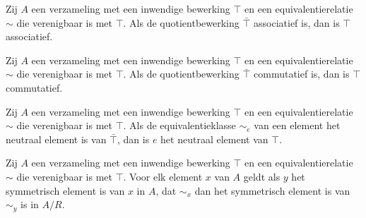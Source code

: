 \documentclass[main.tex]{subfiles}
\begin{document}
\begin{st}
    Zij $A$ een verzameling met een inwendige bewerking $\top$ en een equivalentierelatie $\sim$ die verenigbaar is met $\top$.
    Als de quotientbewerking $\bar{\top}$ associatief is, dan is $\top$ associatief.
  
\end{st}

\begin{st}
    Zij $A$ een verzameling met een inwendige bewerking $\top$ en een equivalentierelatie $\sim$ die verenigbaar is met $\top$.
    Als de quotientbewerking $\bar{\top}$ commutatief is, dan is $\top$ commutatief.
  
\end{st}

\begin{st}
    Zij $A$ een verzameling met een inwendige bewerking $\top$ en een equivalentierelatie $\sim$ die verenigbaar is met $\top$.
    Als de equivalentieklasse $\sim_{e}$ van een element het neutraal element is van $\bar{\top}$, dan is $e$ het neutraal element van $\top$. 
  
\end{st}


\begin{st}
    Zij $A$ een verzameling met een inwendige bewerking $\top$ en een equivalentierelatie $\sim$ die verenigbaar is met $\top$.
    Voor elk element $x$ van $A$ geldt als $y$ het symmetrisch element is van $x$ in $A$, dat $\sim_{x}$ dan het symmetrisch element is van $\sim_{y}$ is in $A/R$.
  
\end{st}
 
\end{document}
